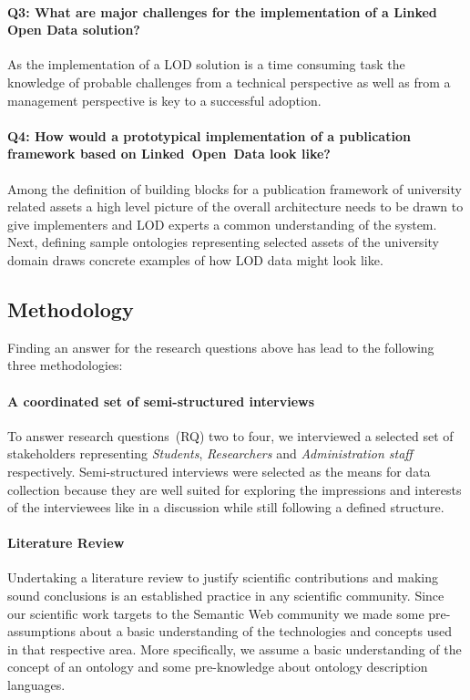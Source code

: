 \documentclass{article}
\begin{document}
\paragraph{Q3: What are major challenges for the implementation of a Linked Open Data solution?}
As the implementation of a LOD solution is a time consuming task the knowledge of probable challenges from a technical perspective as well as from a management perspective is key to a successful adoption. 
\paragraph{Q4: How would a prototypical implementation of a publication framework based on Linked~Open~Data look like?}
Among the definition of building blocks for a publication framework of university related assets a high level picture of the overall architecture needs to be drawn to give implementers and LOD experts a common understanding of the system. Next, defining sample ontologies representing selected assets of the university domain draws concrete examples of how LOD data might look like. 

\subsection{Methodology}
Finding an answer for the research questions above has lead to the following three methodologies:
\paragraph{A coordinated set of semi-structured interviews}
To answer research questions~(RQ) two to four, we interviewed a selected set of stakeholders representing \textit{Students}, \textit{Researchers} and \textit{Administration staff} respectively. Semi-structured interviews were selected as the means for data collection because they are well suited for exploring the impressions and interests of the interviewees like in a discussion while still following a defined structure. 
\paragraph{Literature Review}
Undertaking a literature review to justify scientific contributions and making sound conclusions is an established practice in any scientific community. Since our scientific work targets to the Semantic Web community we made some pre-assumptions about a basic understanding of the technologies and concepts used in that respective area. More specifically, we assume a basic understanding of the concept of an ontology and some pre-knowledge about ontology description languages. 
\end{document}

